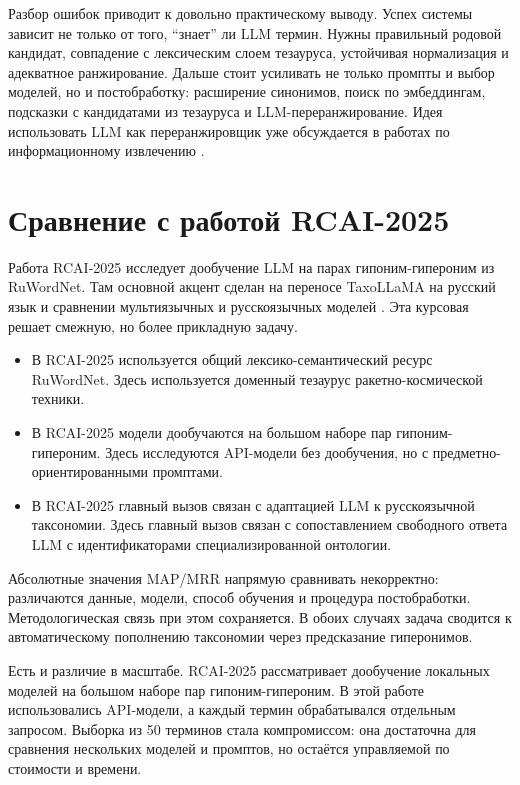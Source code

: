 \documentclass[12pt,a4paper,oneside,openany]{report}
\begin{document}
Разбор ошибок приводит к довольно практическому выводу. Успех системы зависит не только от того, ``знает'' ли LLM термин. Нужны правильный родовой кандидат, совпадение с лексическим слоем тезауруса, устойчивая нормализация и адекватное ранжирование. Дальше стоит усиливать не только промпты и выбор моделей, но и постобработку: расширение синонимов, поиск по эмбеддингам, подсказки с кандидатами из тезауруса и LLM-переранжирование. Идея использовать LLM как переранжировщик уже обсуждается в работах по информационному извлечению \cite{ma2023reranker}.

\chapter{Сравнение с работой RCAI-2025}

Работа RCAI-2025 исследует дообучение LLM на парах гипоним-гипероним из RuWordNet. Там основной акцент сделан на переносе TaxoLLaMA на русский язык и сравнении мультиязычных и русскоязычных моделей \cite{rcai2025,taxollama}. Эта курсовая решает смежную, но более прикладную задачу.

\begin{itemize}
  \item В RCAI-2025 используется общий лексико-семантический ресурс RuWordNet. Здесь используется доменный тезаурус ракетно-космической техники.
  \item В RCAI-2025 модели дообучаются на большом наборе пар гипоним-гипероним. Здесь исследуются API-модели без дообучения, но с предметно-ориентированными промптами.
  \item В RCAI-2025 главный вызов связан с адаптацией LLM к русскоязычной таксономии. Здесь главный вызов связан с сопоставлением свободного ответа LLM с идентификаторами специализированной онтологии.
\end{itemize}

Абсолютные значения MAP/MRR напрямую сравнивать некорректно: различаются данные, модели, способ обучения и процедура постобработки. Методологическая связь при этом сохраняется. В обоих случаях задача сводится к автоматическому пополнению таксономии через предсказание гиперонимов.

Есть и различие в масштабе. RCAI-2025 рассматривает дообучение локальных моделей на большом наборе пар гипоним-гипероним. В этой работе использовались API-модели, а каждый термин обрабатывался отдельным запросом. Выборка из 50 терминов стала компромиссом: она достаточна для сравнения нескольких моделей и промптов, но остаётся управляемой по стоимости и времени.
\end{document}
